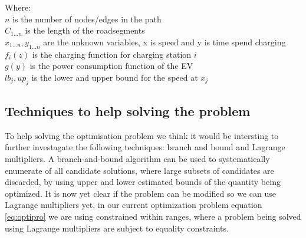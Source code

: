 Where: \\
$n$ is the number of nodes/edges in the path \\
$C_{1 \dots n}$ is the length of the roadsegments \\
$x_{1 \dots n}, y_{1 \dots n}$ are the unknown variables, x is speed and y is time spend charging \\
$f_{i}(z)$ is the charging function for charging station $i$ \\
$g(y)$ is the power consumption function of the EV \\
$lb_j, up_j$ is the lower and upper bound for the speed at $x_j$  \\

\subsection{Techniques to help solving the problem}
To help solving the optimisation problem we think it would be intersting to further investagate the following techniques: branch and bound and Lagrange multipliers.
A branch-and-bound algorithm can be used to systematically enumerate  of all candidate solutions, where large subsets of candidates are discarded, by using upper and lower estimated bounds of the quantity being optimized. 
It is now yet clear if the problem can be modified so we can use Lagrange multipliers yet, in our current optimization problem equation \ref{eq:optipro} we are using constrained within ranges, where a problem being solved using Lagrange multipliers are subject to equality constraints.


